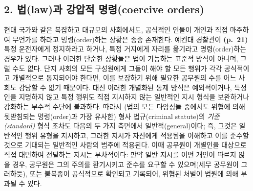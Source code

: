 \documentclass[12pt, oneside]{book}  %
\begin{document}
\subsection{\texorpdfstring{\textbf{2. 법(law)과 강압적 명령(coercive
orders)}}{2. 법(law)과 강압적 명령(coercive orders)}}\label{uxbc95lawuxacfc-uxac15uxc555uxc801-uxba85uxb839coercive-orders}

현대 국가와 같은 복잡하고 대규모의 사회에서도, 공식적인 인물이 개인과
직접 마주하여 무언가를 하라고 명령(order)하는 상황은 종종 존재한다.
예컨대 경찰관이 \textbf{(p.~21)} 특정 운전자에게 정지하라고 하거나, 특정
거지에게 자리를 옮기라고 명령(order)하는 경우가 있다. 그러나 이러한
단순한 상황들은 법이 기능하는 표준적 방식이 아니며, 그럴 수도 없다. 단지
사회의 모든 구성원에게 그들이 해야 할 모든 행위가 각각 공식적이고
개별적으로 통지되어야 한다면, 이를 보장하기 위해 필요한 공무원의 수를
어느 사회도 감당할 수 없기 때문이다. 대신 이러한 개별화된 통제 방식은
예외적이거나, 특정인을 지명하지 않고 특정 행위도 직접 지시하지 않는
일반적인 지시 형식을 보완하거나 강화하는 부수적 수단에 불과하다. 따라서
(법의 모든 다양성들 중에서도 위협에 의해 뒷받침되는 명령(order)과 가장
유사한) 형사 법규(criminal statute)의 \emph{기준(standard)} 형식 조차도
다음의 두 가지 측면에서 일반적(general)이다; 즉, 그것은 일반적인 행위
유형을 지시하고, 그러한 지시가 자신에게 적용됨을 이해하고 이를 준수할
것으로 기대되는 일반적인 사람의 범주에 적용된다. 이때 공무원이 개별인을
대상으로 직접 대면하여 전달하는 지시는 부차적이다: 만약 일반 지시를 어떤
개인이 따르지 않을 경우, 공무원은 그의 주의를 환기시키고 준수를 요구할
수 있으며(세무 공무원이 그러하듯), 또는 불복종이 공식적으로 확인되고
기록되어, 위협된 처벌이 법원에 의해 부과될 수 있다.
\end{document}
